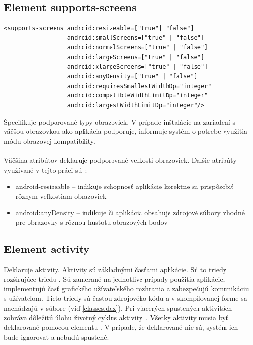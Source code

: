 \subsection{Element supports-screens}
\lstset{language=XML}
\begin{lstlisting}
<supports-screens android:resizeable=["true"| "false"]
                  android:smallScreens=["true" | "false"]
                  android:normalScreens=["true" | "false"]
                  android:largeScreens=["true" | "false"]
                  android:xlargeScreens=["true" | "false"]
                  android:anyDensity=["true" | "false"]
                  android:requiresSmallestWidthDp="integer"
                  android:compatibleWidthLimitDp="integer"
                  android:largestWidthLimitDp="integer"/>
\end{lstlisting}
Špecifikuje podporované typy obrazoviek. V prípade inštalácie na zariadení s väčšou obrazovkou ako aplikácia podporuje, informuje systém o potrebe využitia módu obrazovej kompatibility.\\\\ Väčšina atribútov deklaruje podporované veľkosti obrazoviek. Ďalšie atribúty využívané v tejto práci sú~\cite{elScreen}:\\
\begin{itemize}
\item android-resizeable – indikuje schopnosť aplikácie korektne sa prispôsobiť rôznym veľkostiam obrazoviek
\item android:anyDensity – indikuje či aplikácia obsahuje zdrojové súbory vhodné pre obrazovky s rôznou hustotu obrazových bodov
\end{itemize}

\subsection{Element activity}
\label{el_activity}
Deklaruje aktivity. Aktivity sú základnými časťami aplikácie. Sú to triedy rozširujúce triedu . Sú zamerané na jednotlivé prípady použitia aplikácie, implementujú časť grafického užívateľského rozhrania a zabezpečujú komunikáciu s užívateľom. Tieto triedy sú časťou zdrojového kódu a v skompilovanej forme sa nachádzajú v súbore  (viď \ref{classes.dex}). Pri viacerých spustených aktivitách zohráva dôležitú úlohu životný cyklus aktivity~\cite{elActivity}. Všetky aktivity musia byť deklarované pomocou elementu . V prípade, že deklarované nie sú, systém ich bude ignorovať a nebudú spustené.

